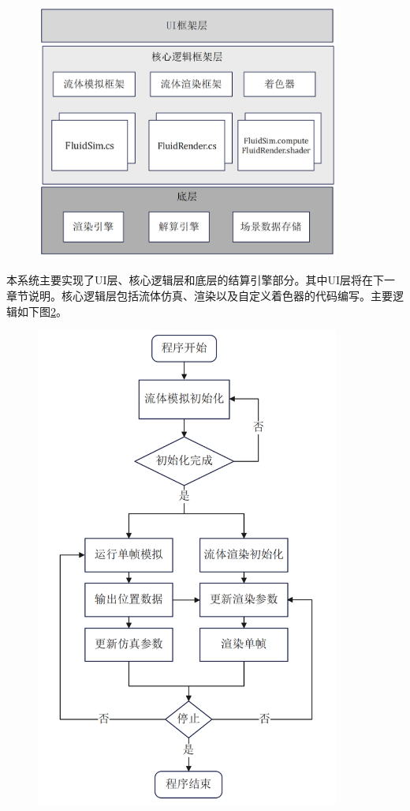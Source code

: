 \begin{figure}[ht]
    \centering
    \includegraphics[width=10cm]{image/pipeline3.png}
    \label{fig:pipeline3}
\end{figure}

本系统主要实现了UI层、核心逻辑层和底层的结算引擎部分。其中UI层将在下一章节说明。核心逻辑层包括流体仿真、渲染以及自定义着色器的代码编写。主要逻辑如下图\ref{fig:pipeline4}。

\begin{figure}[ht]
    \centering
    \includegraphics[width=10cm]{image/pipeline4.png}
    \label{fig:pipeline4}
\end{figure}

